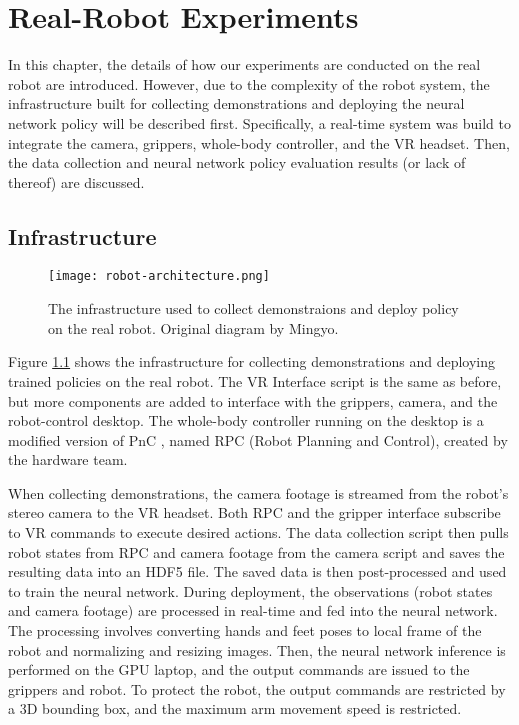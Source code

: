 \chapter{Real-Robot Experiments}

In this chapter, the details of how our experiments are conducted on the real robot are introduced. 
However, due to the complexity of the robot system, the infrastructure built for collecting demonstrations and deploying the neural network policy will be described first. Specifically, a real-time system was build to integrate the camera, grippers, whole-body controller, and the VR headset. Then, the data collection and neural network policy evaluation results (or lack of thereof) are discussed. 

\section{Infrastructure}

\begin{figure}
	\centering
	\texttt{[image: robot-architecture.png]}
    \caption{The infrastructure used to collect demonstraions and deploy policy on the real robot. Original diagram by Mingyo.}
    \label{fig:robot-architecture}
\end{figure}

Figure \ref{fig:robot-architecture} shows the infrastructure for collecting demonstrations and deploying trained policies on the real robot. 
The VR Interface script is the same as before, but more components are added to interface with the grippers, camera, and the robot-control desktop. The whole-body controller running on the desktop is a modified version of PnC \cite{Ahn2021VersatileLP}, named RPC (Robot Planning and Control), created by the hardware team. 

When collecting demonstrations, the camera footage is streamed from the robot's stereo camera to the VR headset. Both RPC and the gripper interface subscribe to VR commands to execute desired actions. The data collection script then pulls robot states from RPC and camera footage from the camera script and saves the resulting data into an HDF5 file. The saved data is then post-processed and used to train the neural network. 
During deployment, the observations (robot states and camera footage) are processed in real-time and fed into the neural network. The processing involves converting hands and feet poses to local frame of the robot and normalizing and resizing images. Then, the neural network inference is performed on the GPU laptop, and the output commands are issued to the grippers and robot. To protect the robot, the output commands are restricted by a 3D bounding box, and the maximum arm movement speed is restricted. 

